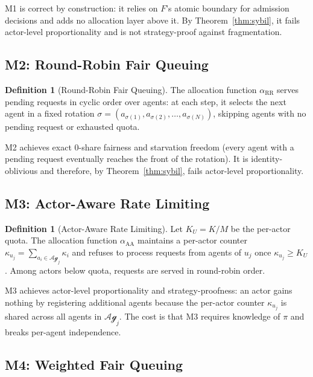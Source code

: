 \documentclass[11pt]{article}
\theoremstyle{plain}
\theoremstyle{definition}
\newtheorem{definition}[theorem]{Definition}
\theoremstyle{remark}
\newcommand{\Agents}{\mathcal{Ag}}         %
\newcommand{\Kcap}{K}                      %
\newcommand{\alloc}{\alpha}                %
\newcommand{\owner}{\pi}                   %
\begin{document}
M1 is correct by construction: it relies on $F$'s atomic boundary for
admission decisions and adds no allocation layer above it.  By
Theorem~\ref{thm:sybil}, it fails actor-level proportionality and is
not strategy-proof against fragmentation.

\subsection{M2: Round-Robin Fair Queuing}
\label{sec:m2}

\begin{definition}[Round-Robin Fair Queuing]
\label{def:m2}
The allocation function $\alloc_{\mathrm{RR}}$ serves pending requests
in cyclic order over agents: at each step, it selects the next agent
in a fixed rotation $\sigma = (a_{\sigma(1)}, a_{\sigma(2)}, \ldots,
a_{\sigma(N)})$, skipping agents with no pending request or exhausted
quota.
\end{definition}

M2 achieves exact $0$-share fairness and starvation freedom (every
agent with a pending request eventually reaches the front of the
rotation).  It is identity-oblivious and therefore, by
Theorem~\ref{thm:sybil}, fails actor-level proportionality.

\subsection{M3: Actor-Aware Rate Limiting}
\label{sec:m3}

\begin{definition}[Actor-Aware Rate Limiting]
\label{def:m3}
Let $K_U = \Kcap / M$ be the per-actor quota.  The allocation function
$\alloc_{\mathrm{AA}}$ maintains a per-actor counter
$\kappa_{u_j} = \sum_{a_i \in \Agents_j} \kappa_i$ and refuses to
process requests from agents of $u_j$ once $\kappa_{u_j} \geq K_U$.
Among actors below quota, requests are served in round-robin order.
\end{definition}

M3 achieves actor-level proportionality and strategy-proofness: an
actor gains nothing by registering additional agents because the
per-actor counter $\kappa_{u_j}$ is shared across all agents in
$\Agents_j$.  The cost is that M3 requires knowledge of $\owner$ and
breaks per-agent independence.

\subsection{M4: Weighted Fair Queuing}
\label{sec:m4}
\end{document}
